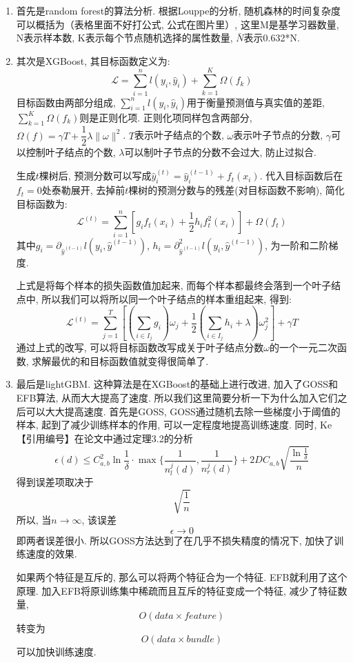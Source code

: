 \documentclass[a4paper,UTF8]{article}
\begin{document}
\begin{enumerate}
  \item 首先是random forest的算法分析. 根据Louppe\cite{ref4}的分析, 随机森林的时间复杂度可以概括为（表格里面不好打公式, 公式在图片里）, 这里M是基学习器数量, N表示样本数, K表示每个节点随机选择的属性数量, $\bar{N}$表示0.632*N.
  \item 其次是XGBoost, 其目标函数定义为: 
  $$\mathcal{L}=\sum_{i=1}^nl(y_i,\hat{y}_i)+\sum_{k=1}^K\Omega(f_k)$$
  目标函数由两部分组成, $\sum_{i=1}^nl(y_i,\hat{y}_i)$用于衡量预测值与真实值的差距, $\sum_{k=1}^K\Omega(f_k)$则是正则化项. 正则化项同样包含两部分, $\Omega(f)=\gamma T+\dfrac{1}{2}\lambda\|\omega\|^2$. $T$表示叶子结点的个数, $\omega$表示叶子节点的分数, $\gamma$可以控制叶子结点的个数, $\lambda$可以制叶子节点的分数不会过大, 防止过拟合.
  
  生成$t$棵树后, 预测分数可以写成$\hat{y}_i^{(t)}=\hat{y}_i^{(t-1)}+f_t(x_i)$. 代入目标函数后在$f_t=0$处泰勒展开, 去掉前$t$棵树的预测分数与​的残差(对目标函数不影响), 简化目标函数为:
  $$\mathcal{L}^{(t)}=\sum_{i=1}^n\left[g_if_t(x_i)+\dfrac{1}{2}h_if_t^2(x_i)\right]+\Omega(f_t)$$
  其中$g_i=\partial_{\hat{y}^{(t-1)}}l(y_i,\hat{y}^{(t-1)})$, $h_i=\partial^2_{\hat{y}^{(t-1)}}l(y_i,\hat{y}^{(t-1)})$, 为一阶和二阶梯度.
  
  上式是将每个样本的损失函数值加起来, 而每个样本都最终会落到一个叶子结点中, 所以我们可以将所以同一个叶子结点的样本重组起来, 得到:
  $$\mathcal{L}^{(t)}=\sum_{j=1}^{T}\left[\left(\sum_{i\in I_j}g_i\right)\omega_j+\dfrac{1}{2}\left(\sum_{i\in I_j}h_i+\lambda\right)\omega_j^2\right]+\gamma T$$
  通过上式的改写, 可以将目标函数改写成关于叶子结点分数$\omega$的一个一元二次函数, 求解最优的​和目标函数值就变得很简单了.
  \item 最后是lightGBM. 这种算法是在XGBoost的基础上进行改进, 加入了GOSS和EFB算法, 从而大大提高了速度. 所以我们这里简要分析一下为什么加入它们之后可以大大提高速度. 首先是GOSS, GOSS通过随机去除一些梯度小于阈值的样本, 起到了减少训练样本的作用, 可以一定程度地提高训练速度. 同时, Ke【引用编号】在论文中通过定理3.2的分析
  $$\epsilon (d) \leq C_{a,b}^2 \ln \frac{1}{\delta} \cdot \max\{ \frac{1}{n_{l}^{j}(d) },\frac{1}{n_{r}^{j}(d)}\}+2DC_{a,b}\sqrt{ \frac{\ln{\frac{1}{\delta}}}{n}}$$
  得到误差项取决于
  $$\sqrt{\frac{1}{n}}$$
  所以, 当$n \rightarrow \infty$, 该误差
  $$\epsilon \rightarrow 0$$
  即两者误差很小. 所以GOSS方法达到了在几乎不损失精度的情况下, 加快了训练速度的效果. 
  
  如果两个特征是互斥的, 那么可以将两个特征合为一个特征. EFB就利用了这个原理. 加入EFB将原训练集中稀疏而且互斥的特征变成一个特征, 减少了特征数量, 
  $$O(data \times feature)$$
  转变为
  $$O(data \times bundle)$$
  可以加快训练速度.
\end{enumerate}
\end{document}
